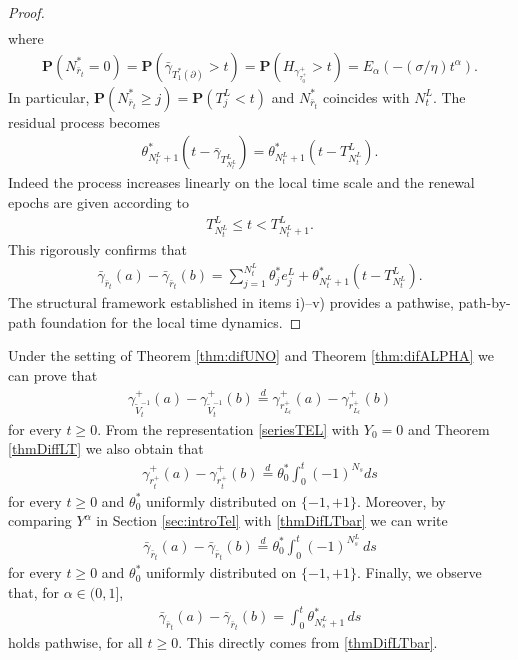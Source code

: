\documentclass[10pt,a4paper]{article}
\numberwithin{equation}{section}
\theoremstyle{plain}
\theoremstyle{remark}
\begin{document}
\begin{proof}
\begin{align*}
\end{align*}
where
\begin{align*}
\mathbf{P}(N^*_{\bar{r}_t} = 0) = \mathbf{P} (\bar{\gamma}_{T^*_1(\partial)} > t) = \mathbf{P}(H_{\gamma^+_{\tau^+_0}} > t) = E_\alpha(- (\sigma/\eta) t^\alpha).
\end{align*}
In particular, $\mathbf{P}(N^*_{\bar{r}_t} \geq j) = \mathbf{P}(T^L_j < t)$ and $N^*_{\bar{r}_t}$ coincides with $N^L_t$. The residual process becomes
\begin{align*}
\theta^*_{N^L_t + 1} \left( t - \bar{\gamma}_{T^L_{N^L_t}} \right) = \theta^*_{N^L_t + 1} \left( t - T^L_{N^L_t} \right).
\end{align*}
Indeed the process increases linearly on the local time scale and the renewal epochs are given according to
\begin{align*}
T^L_{N^L_t} \leq t < T^L_{N^L_t + 1}.
\end{align*}
This rigorously confirms that
\begin{align*}
\bar{\gamma}_{\bar{r}_t}(a) - \bar{\gamma}_{\bar{r}_t}(b) = \sum_{j=1}^{N^L_t} \theta^*_j e^L_j + \theta^*_{N^L_t+1} \left( t - T^L_{N^L_t} \right).
\end{align*}
The structural framework established in items i)--v) provides a pathwise, path-by-path foundation for the local time dynamics. 
\end{proof}

Under the setting of Theorem \ref{thm:difUNO} and Theorem \ref{thm:difALPHA} we can prove that
\begin{align*}
\gamma^+_{\tilde{V}^{-1}_t}(a) - \gamma^+_{\tilde{V}^{-1}_t} (b) \stackrel{d}{=} \gamma^+_{r^+_{L_t}}(a) - \gamma^+_{r^+_{L_t}}(b)
\end{align*}
for every $t\geq 0$. From the representation \eqref{seriesTEL} with $Y_0=0$ and Theorem \ref{thmDiffLT} we also obtain that
\begin{align*}
\gamma^+_{r^+_t}(a) - \gamma^+_{r^+_t}(b) \stackrel{d}{=} \theta^*_0 \int_0^t (-1)^{N_s} ds
\end{align*}
for every $t\geq 0$ and $\theta^*_0$ uniformly distributed on $\{-1, +1\}$. Moreover, by comparing $Y^\alpha$ in Section \ref{sec:introTel} with \eqref{thmDifLTbar} we can write
\begin{align*}
\bar{\gamma}_{\bar{r}_t}(a) - \bar{\gamma}_{\bar{r}_t}(b) \stackrel{d}{=} \theta^*_0 \int_0^t (-1)^{N^L_s}\, ds
\end{align*}
for every $t\geq 0$ and $\theta^*_0$ uniformly distributed on $\{-1, +1\}$. Finally, we observe that, for $\alpha \in (0,1]$, 
\begin{align*}
\bar{\gamma}_{\bar{r}_t}(a) - \bar{\gamma}_{\bar{r}_t}(b) = \int_0^t \theta^*_{N^L_s + 1}\,  ds 
\end{align*}
holds pathwise, for all $t \geq 0$. This directly comes from  \eqref{thmDifLTbar}.
\end{document}
